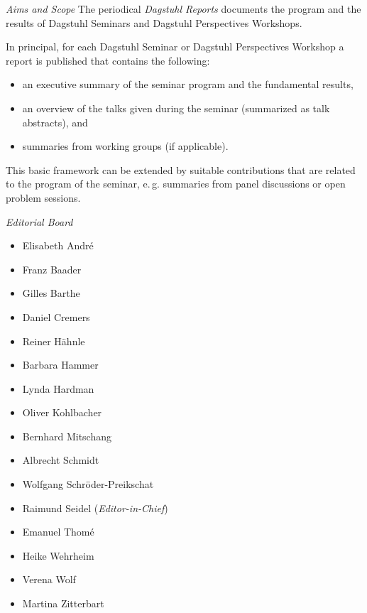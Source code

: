 \documentclass[a4paper,USenglish]{dagrep-master-v2021}
\begin{document}
\begin{publicationinfo}
\newpage


\bigskip
\bigskip


\emph{Aims and Scope}\newline
The periodical \emph{Dagstuhl Reports} documents the program and the results of Dagstuhl Seminars and Dagstuhl Perspectives Workshops.

In principal, for each Dagstuhl Seminar or Dagstuhl Perspectives Workshop a report is published that contains the following:
\begin{itemize}
\item an executive summary of the seminar program and the fundamental results,
\item an overview of the talks given during the seminar (summarized as talk abstracts), and
\item summaries from working groups (if applicable).
\end{itemize}

This basic framework can be extended by suitable contributions that are related to the program of the seminar, e.\,g. summaries from panel discussions or open problem sessions.
 
\medskip
\medskip

\emph{Editorial Board}
\begin{itemize}
\item Elisabeth Andr\'{e}
\item Franz Baader
\item Gilles Barthe
\item Daniel Cremers
\item Reiner H\"ahnle
\item Barbara Hammer
\item Lynda Hardman
\item Oliver Kohlbacher
\item Bernhard Mitschang
\item Albrecht Schmidt
\item Wolfgang Schr\"{o}der-Preikschat
\item Raimund Seidel (\emph{Editor-in-Chief})
\item Emanuel Thom\'{e}
\item Heike Wehrheim
\item Verena Wolf
\item Martina Zitterbart
\end{itemize}


\end{publicationinfo}
\end{document}
